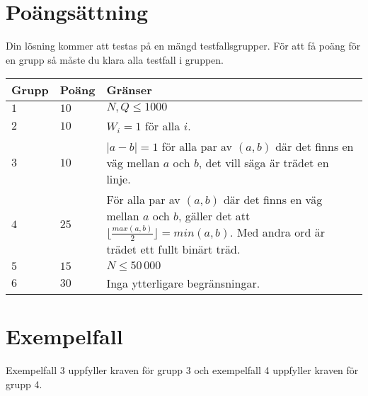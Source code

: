 \section*{Poängsättning}
Din lösning kommer att testas på en mängd testfallsgrupper.
För att få poäng för en grupp så måste du klara alla testfall i gruppen.

\noindent
\begin{tabular}{| l | l | p{12cm} |}
  \hline
  \textbf{Grupp} & \textbf{Poäng} & \textbf{Gränser} \\ \hline
  $1$    & $10$       & $N, Q \leq 1000$ \\ \hline
  $2$    & $10$       & $W_i=1$ för alla $i$. \\ \hline
  $3$    & $10$       & $|a-b|=1$ för alla par av $(a,b)$ där det finns en väg mellan $a$ och $b$, det vill säga är trädet en linje. \\ \hline
  $4$    & $25$       & För alla par av $(a,b)$ där det finns en väg mellan $a$ och $b$, gäller det att $\lfloor\frac{max(a,b)}{2} \rfloor=min(a,b)$.
  Med andra ord är trädet ett fullt binärt träd. \\ \hline
  $5$    & $15$       & $N \leq 50\,000$ \\ \hline
  $6$    & $30$       & Inga ytterligare begränsningar. \\ \hline
\end{tabular}

\section*{Exempelfall}
Exempelfall 3 uppfyller kraven för grupp 3 och exempelfall 4 uppfyller kraven för grupp 4.
